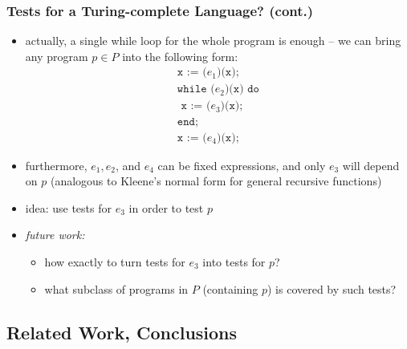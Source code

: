 \documentclass{beamer}
\begin{document}
\begin{frame}
  \frametitle{Tests for a Turing-complete Language? (cont.)}
  \begin{itemize}
    \item actually, a single while loop for the whole program is enough
      -- we can bring any program $p \in P$ into the following form:
      \[\begin{array}{l}
      \texttt{x := (} e_1 \texttt{)(x);} \\
      \texttt{while (} e_2 \texttt{)(x) do} \\
      \texttt{    x := (} e_3 \texttt{)(x);} \\
      \texttt{end;} \\
      \texttt{x := (} e_4 \texttt{)(x);}
      \end{array} 
      \]
    \item furthermore, $e_1, e_2$, and $e_4$ can be fixed expressions,
      and only $e_3$ will depend on $p$
    (analogous to Kleene's normal form for general recursive functions)
    \item idea: use tests for $e_3$ in order to test $p$
    \item \emph{future work:}
    \begin{itemize}
      \item how exactly to turn tests for $e_3$ into tests for $p$?
      \item what subclass of programs in $P$ (containing $p$) is covered by such tests?
    \end{itemize}
  \end{itemize}
\end{frame}

\subsection{Related Work, Conclusions} 
\end{document}
